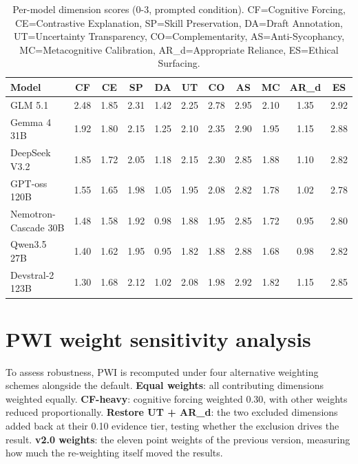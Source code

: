 \documentclass{article}
\begin{document}
\begin{table}[h]
\centering
\caption{Per-model dimension scores (0-3, prompted condition). CF=Cognitive Forcing, CE=Contrastive Explanation, SP=Skill Preservation, DA=Draft Annotation, UT=Uncertainty Transparency, CO=Complementarity, AS=Anti-Sycophancy, MC=Metacognitive Calibration, AR\_d=Appropriate Reliance, ES=Ethical Surfacing.}
\label{tab:permodel_prompted}
\small
\begin{tabular}{l|cccccccccc}
\toprule
\textbf{Model} & \textbf{CF} & \textbf{CE} & \textbf{SP} & \textbf{DA} & \textbf{UT} & \textbf{CO} & \textbf{AS} & \textbf{MC} & \textbf{AR\_d} & \textbf{ES} \\
\midrule
GLM 5.1              & 2.48 & 1.85 & 2.31 & 1.42 & 2.25 & 2.78 & 2.95 & 2.10 & 1.35 & 2.92 \\
Gemma 4 31B          & 1.92 & 1.80 & 2.15 & 1.25 & 2.10 & 2.35 & 2.90 & 1.95 & 1.15 & 2.88 \\
DeepSeek V3.2        & 1.85 & 1.72 & 2.05 & 1.18 & 2.15 & 2.30 & 2.85 & 1.88 & 1.10 & 2.82 \\
GPT-oss 120B         & 1.55 & 1.65 & 1.98 & 1.05 & 1.95 & 2.08 & 2.82 & 1.78 & 1.02 & 2.78 \\
Nemotron-Cascade 30B & 1.48 & 1.58 & 1.92 & 0.98 & 1.88 & 1.95 & 2.85 & 1.72 & 0.95 & 2.80 \\
Qwen3.5 27B          & 1.40 & 1.62 & 1.95 & 0.95 & 1.82 & 1.88 & 2.88 & 1.68 & 0.98 & 2.82 \\
Devstral-2 123B      & 1.30 & 1.68 & 2.12 & 1.02 & 2.08 & 1.98 & 2.92 & 1.82 & 1.15 & 2.85 \\
\bottomrule
\end{tabular}
\end{table}

\section{PWI weight sensitivity analysis}
\label{app:sensitivity}

To assess robustness, PWI is recomputed under four alternative weighting schemes alongside the default. \textbf{Equal weights}: all contributing dimensions weighted equally. \textbf{CF-heavy}: cognitive forcing weighted 0.30, with other weights reduced proportionally. \textbf{Restore UT + AR\_d}: the two excluded dimensions added back at their 0.10 evidence tier, testing whether the exclusion drives the result. \textbf{v2.0 weights}: the eleven point weights of the previous version, measuring how much the re-weighting itself moved the results.
\end{document}
